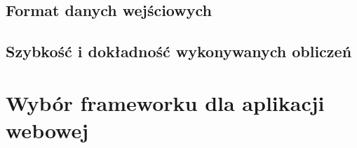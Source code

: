 \documentclass[pdflatex,11pt]{aghproc}
\begin{document}
\subsection{Format danych wejściowych}
\label{subsec:format_danych_wejsciowych}

\subsection{Szybkość i dokładność wykonywanych obliczeń}
\label{subsec:szybkosc_i_dokladnosc_wykonywanych_obliczen}

\section{Wybór frameworku dla aplikacji webowej}
\label{sec:wybor_frameworku_dla_aplikacji_webowej}

% 
% 



%
%
%
%
\end{document}

